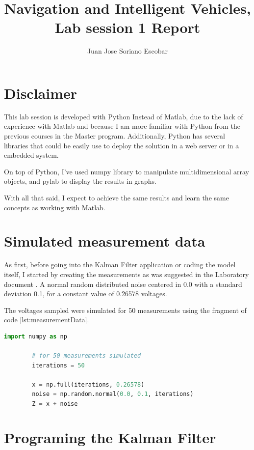 \documentclass{article}
\begin{document}
    \title{Navigation and Intelligent Vehicles, Lab session 1 Report}
    \author{Juan Jose Soriano Escobar }
    \maketitle
    \newpage

    \section*{Disclaimer}

    This lab session is developed with Python Instead of Matlab, due to the lack of experience with Matlab
    and because I am more familiar with Python from the previous courses in the Master program. Additionally,
    Python has several libraries that could be easily use to deploy the solution in a web server or in a embedded system.

    On top of Python, I've used numpy library to manipulate multidimensional array objects, and pylab to display the results in graphs. 

    With all that said, I expect to achieve the same results and learn the same concepts as working with Matlab.

    \section{Simulated measurement data}
    

    As  first, before going into the Kalman Filter application  or coding the model itself, I started by creating the measurements
    as was suggested in the Laboratory document \cite{LabManual}. A normal random distributed noise centered in 0.0 with a standard deviation 0.1, 
    for a constant value of 0.26578 voltages.

    The voltages sampled were simulated for 50 measurements using the fragment of code \ref{lst:measurementData}.

    \begin{lstlisting}[language=Python, caption= Measurement data simulation, label={lst:measurementData}]
        import numpy as np

        # for 50 measurements simulated
        iterations = 50

        x = np.full(iterations, 0.26578)
        noise = np.random.normal(0.0, 0.1, iterations) 
        Z = x + noise
    \end{lstlisting}

    \section{Programing the Kalman Filter}
\end{document}
